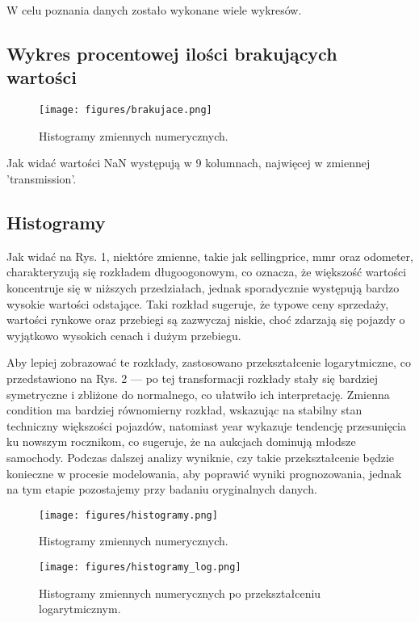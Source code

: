 \documentclass[10pt,letterpaper]{article}
\begin{document}
W celu poznania danych zostało wykonane wiele wykresów.
\subsection{Wykres procentowej ilości brakujących wartości}
\begin{figure}[H]
\begin{center}
   \texttt{[image: figures/brakujace.png]}
\caption{Histogramy zmiennych numerycznych.}
   \label{fig:other-figure}
\end{center}
\end{figure}
Jak widać wartości NaN występują w 9 kolumnach, najwięcej w zmiennej 'transmission'.

\subsection{Histogramy}

Jak widać na Rys. 1, niektóre zmienne, takie jak sellingprice, mmr oraz odometer, charakteryzują się rozkładem długoogonowym, co oznacza, że większość wartości koncentruje się w niższych przedziałach, jednak sporadycznie występują bardzo wysokie wartości odstające. Taki rozkład sugeruje, że typowe ceny sprzedaży, wartości rynkowe oraz przebiegi są zazwyczaj niskie, choć zdarzają się pojazdy o wyjątkowo wysokich cenach i dużym przebiegu. 

Aby lepiej zobrazować te rozkłady, zastosowano przekształcenie logarytmiczne, co przedstawiono na Rys. 2 — po tej transformacji rozkłady stały się bardziej symetryczne i zbliżone do normalnego, co ułatwiło ich interpretację. Zmienna condition ma bardziej równomierny rozkład, wskazując na stabilny stan techniczny większości pojazdów, natomiast year wykazuje tendencję przesunięcia ku nowszym rocznikom, co sugeruje, że na aukcjach dominują młodsze samochody. Podczas dalszej analizy wyniknie, czy takie przekształcenie będzie konieczne w procesie modelowania, aby poprawić wyniki prognozowania, jednak na tym etapie pozostajemy przy badaniu oryginalnych danych.

\begin{figure}[H]
\begin{center}
   \texttt{[image: figures/histogramy.png]}
\caption{Histogramy zmiennych numerycznych.}
   \label{fig:other-figure}
\end{center}
\end{figure}

\begin{figure}[H]
\begin{center}
   \texttt{[image: figures/histogramy\_log.png]}
   \caption{Histogramy zmiennych numerycznych po przekształceniu logarytmicznym.}
   \label{fig:other-figure-log}
\end{center}
\end{figure}
\end{document}
